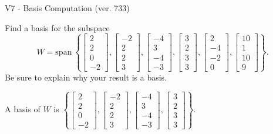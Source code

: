 \begin{exercise}
  \begin{exerciseTitle}V7 - Basis Computation (ver. 733)\end{exerciseTitle}
  \begin{exerciseStatement}
    Find a basis for the subspace 
\[W=\mathrm{span}\ \left\{\left[\begin{array}{r}
2 \\
2 \\
0 \\
-2
\end{array}\right] , \left[\begin{array}{r}
-2 \\
2 \\
2 \\
3
\end{array}\right] , \left[\begin{array}{r}
-4 \\
3 \\
-4 \\
-3
\end{array}\right] , \left[\begin{array}{r}
3 \\
2 \\
3 \\
3
\end{array}\right] , \left[\begin{array}{r}
2 \\
-4 \\
-2 \\
0
\end{array}\right] , \left[\begin{array}{r}
10 \\
1 \\
10 \\
9
\end{array}\right]\right\}.\]
 Be sure to explain why your result is a basis.


  \end{exerciseStatement}
  \begin{exerciseAnswer}
   A basis of \(W\) is  \(\left\{\left[\begin{array}{r}
2 \\
2 \\
0 \\
-2
\end{array}\right] , \left[\begin{array}{r}
-2 \\
2 \\
2 \\
3
\end{array}\right] , \left[\begin{array}{r}
-4 \\
3 \\
-4 \\
-3
\end{array}\right] , \left[\begin{array}{r}
3 \\
2 \\
3 \\
3
\end{array}\right]\right\}\).
  


  \end{exerciseAnswer}
\end{exercise}